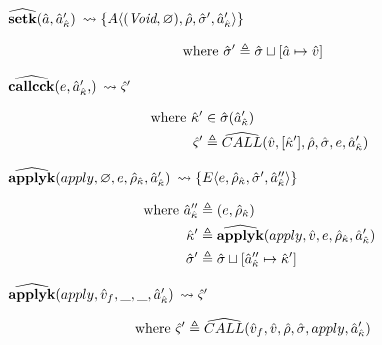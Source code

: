 \documentclass[12pt,draft]{article}
\newcommand{\E}[4]{E\langle #1 , #2 , #3 , #4 \rangle}
\newcommand{\A}[4]{A\langle #1 , #2 , #3 , #4 \rangle}
\begin{document}
\begin{multicols*}{2}
  \begin{center}
    $\widehat{\textbf{setk}}(\hat{a} , \hat{a}_{\hat{\kappa}}')$
    $\leadsto \{ \A{(\cVoid , \varnothing)}{\aenv}{\astore'}{\akaddr'} \}$
  \end{center}
  \vspace{-7mm}
  \begin{align*}
    \text{where }
    \hat{\sigma}' &\triangleq \hat{\sigma} \sqcup [\hat{a} \mapsto \hat{v}]
  \end{align*}
  \begin{center}
    $\acallcck{e , \akaddr'}$
    $\leadsto \hat{\varsigma}' $
  \end{center}
  \vspace{-7mm}
  \begin{align*}
    \text{where }
    \hat{\kappa}' &\in \hat{\sigma}(\hat{a}_{\hat{\kappa}}') \\
    \hat{\varsigma}' &\triangleq \widehat{CALL}(\hat{v} , [\hat{\kappa}'] ,
               \hat{\rho} , \hat{\sigma} , e , \hat{a}_{\hat{\kappa}}')
  \end{align*}
  \vfill\null
  \columnbreak
  \begin{center}
    $\widehat{\textbf{applyk}}(apply , \varnothing , e , \hat{\rho}_{\hat{\kappa}} , \hat{a}_{\hat{\kappa}}')$
    $\leadsto \{ \E{e}{\aenv_{\akont}}{\astore'}{\akaddr''} \}$
  \end{center}
  \vspace{-7mm}
  \begin{align*}
    \text{where }
    \hat{a}_{\hat{\kappa}}'' &\triangleq (e , \hat{\rho}_{\hat{\kappa}}) \\
    \hat{\kappa}' &\triangleq \widehat{\textbf{applyk}}(apply , \hat{v} , e , \hat{\rho}_{\hat{\kappa}} , \hat{a}_{\hat{\kappa}}') \\
    \hat{\sigma}' &\triangleq \hat{\sigma} \sqcup [\hat{a}_{\hat{\kappa}}'' \mapsto \hat{\kappa}']
  \end{align*}
  \begin{center}
    $\widehat{\textbf{applyk}}(apply , \hat{v}_f , \_ , \_ , \hat{a}_{\hat{\kappa}}')$
    $\leadsto \hat{\varsigma}'$
  \end{center}
  \vspace{-7mm}
  \begin{align*}
    \text{where }
    \hat{\varsigma}' &\triangleq \widehat{CALL}(\hat{v}_f , \hat{v} , \hat{\rho} , \hat{\sigma},apply,\hat{a}_{\hat{\kappa}}')
  \end{align*}

\end{multicols*}
\end{document}

